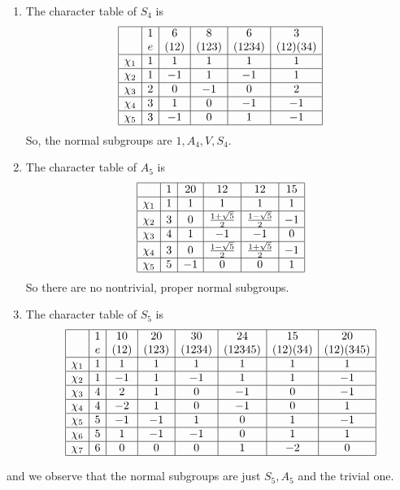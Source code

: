 \documentclass[11pt]{article}
\begin{document}
\begin{enumerate}
\item 
The character table of $S_4$ is
\[
\begin{array}{|c|c|c|c|c|c|}
\hline
&1&6&8&6&3\\
&e&(12)&(123)&(1234)&(12)(34)\\
\hline
\chi_1&1&1&1&1&1\\
\hline
\chi_2&1&-1&1&-1&1\\
\hline
\chi_3&2&0&-1&0&2\\
\hline
\chi_4&3&1&0&-1&-1\\
\hline
\chi_5&3&-1&0&1&-1\\
\hline
\end{array}\]
So, the normal subgroups are $1, A_4, V, S_4$.

\item 
The character table of $A_5$ is
\[
\begin{array}{|c|c|c|c|c|c|}
\hline
&1&20&12&12&15\\
\hline
\chi_1&1&1&1&1&1\\
\hline
\chi_2&3&0& \frac{1+\sqrt5}{2}&\frac{1-\sqrt5}{2}&-1\\
\hline
\chi_3&4&1&-1&-1&0\\
\hline
\chi_4&3&0&\frac{1-\sqrt5}{2}&\frac{1+\sqrt5}{2}&-1\\
\hline
\chi_5&5&-1&0&0&1\\
\hline
\end{array}\]
So there are no nontrivial, proper normal subgroups.

\item 
The character table of $S_5$ is
\[
\begin{array}{|c|c|c|c|c|c|c|c|}
\hline
&1&10&20&30&24&15&20\\
&e&(12)&(123)&(1234)&(12345)&(12)(34)&(12)(345)\\
\hline
\chi_1&1&1&1&1&1&1&1\\
\hline
\chi_2&1&-1&1&-1&1&1&-1\\
\hline
\chi_3&4&2&1&0&-1&0&-1\\
\hline
\chi_4&4&-2&1&0&-1&0&1\\
\hline
\chi_5&5&-1&-1&1&0&1&-1\\
\hline
\chi_6&5&1&-1&-1&0&1&1\\
\hline
\chi_7&6&0&0&0&1&-2&0\\
\hline
\end{array}\]
\end{enumerate}
and we observe that the normal subgroups are just $S_5, A_5$ and the trivial one.
\end{document}
